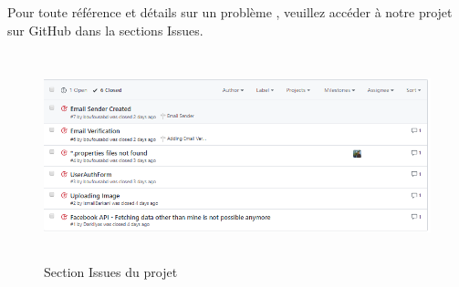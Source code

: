 \documentclass[a4paper]{report}
\begin{document}
\begin{spacing}{2}
\begin{spacing}{2}
\par
Pour toute référence et détails sur un problème , veuillez accéder à notre projet sur GitHub dans la sections Issues. 
\begin{figure}[!ht]
\begin{center}
\includegraphics[height=6cm]{issues.png}
\end{center}
\caption[Section Issues du projet]{Section Issues du projet\protect\footnotemark}
\end{figure}

\end{spacing}

\end{spacing}
\end{document}
